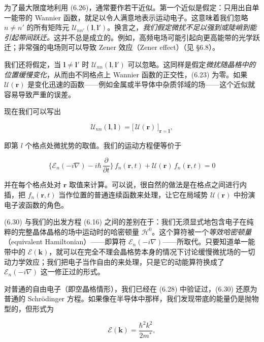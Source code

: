 为了最大限度地利用 (6.26)，通常要作若干近似。第一个近似是假定：只用出自单一能带的 Wannier 函数，就足以令人满意地表示运动电子。这意味着我们忽略 $n \neq n'$ 的所有矩阵元 $\mathcal{U}_{nn'}(\boldsymbol{l},\boldsymbol{l}')$。换言之，\emph{我们假定微扰不足以强到或陡峭到能引起带间跃迁。}这并不总是成立的。例如，高频电场可能引起向更高能带的光学跃迁；非常强的电场则可以导致 Zener 效应（Zener effect）（见 §6.8）。

我们还将假定，当 $\boldsymbol{l} \neq \boldsymbol{l}'$ 时 $\mathcal{U}_{nn}(\boldsymbol{l},\boldsymbol{l}')$ 可以忽略。这同样是假定\emph{微扰随晶格中的位置缓慢变化}，从而由不同格点上 Wannier 函数的正交性，(6.23) 为零。如果 $\mathcal{U}(\mathbf{r})$ 是变化迅速的函数——例如金属或半导体中杂质邻域的场——这个近似就容易导致严重的误差。

现在我们可以写出

\begin{equation*}
\mathcal{U}_{nn}(\boldsymbol{l},\boldsymbol{l}) = \big[\,\mathcal{U}(\mathbf{r})\,\big]_{\mathbf{r}=\boldsymbol{l}},
\tag{6.29}
\end{equation*}

即第 $l$ 个格点处微扰势的取值。我们的运动方程便等价于

\begin{equation*}
\Big\{\mathcal{E}_n(-i\nabla) - i\hbar\,\frac{\partial}{\partial t}\Big\}\,f_n(\mathbf{r},t) + \mathcal{U}(\mathbf{r})\,f_n(\mathbf{r},t) = 0
\tag{6.30}
\end{equation*}

并在每个格点处对 $\mathbf{r}$ 取值来计算。可以说，很自然的做法是在格点之间进行内插，把 $f_n(\mathbf{r},t)$ 当作位置的普通连续函数来处理，让它在局域势 $\mathcal{U}(\mathbf{r})$ 中扮演电子波函数的角色。

(6.30) 与我们的出发方程 (6.16) 之间的差别在于：我们无须显式地包含电子在纯粹的完整晶体晶格的场中运动时的哈密顿量 $\mathcal{H}^0$。这个算符被一个\emph{等效哈密顿量}（equivalent Hamiltonian）——即算符 $\mathcal{E}_n(-i\nabla)$——所取代。只要知道单一能带中的 $\mathcal{E}(\mathbf{k})$，就可以在完全不理会晶格势本身的情况下讨论缓慢微扰场的一切动力学效应；我们把电子当作自由的来处理，只是它的动能算符换成了 $\mathcal{E}_n(-i\nabla)$ 这一修正过的形式。

对普通的自由电子（即空晶格情形），我们已经在 (6.28) 中验证过，(6.30) 还原为普通的 Schrödinger 方程。如果像在半导体中那样，我们发现带底的能量仍是抛物型的，但形式为

\begin{equation*}
\mathcal{E}(\mathbf{k}) = \frac{\hbar^2 k^2}{2m^{*}},
\tag{6.31}
\end{equation*}

